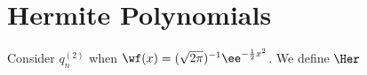 \section{Hermite Polynomials}


Consider $q^{(2)}_n$ when $\wf(x) = (\sqrt{2\pi})^{-1} \ee^{-\frac{1}{2} x^2}$. We define $\Her$